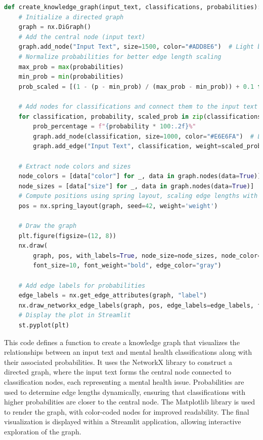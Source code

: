 
\begin{tcolorbox}[colback=gray!5!white, colframe=gray!80!black, boxrule=0.5pt, title=Knowledge Graph Creation]
    \begin{lstlisting}[language=Python]
def create_knowledge_graph(input_text, classifications, probabilities):
    # Initialize a directed graph
    graph = nx.DiGraph()
    # Add the central node (input text)
    graph.add_node("Input Text", size=1500, color="#ADD8E6")  # Light blue for the central node
    # Normalize probabilities for better edge length scaling
    max_prob = max(probabilities)
    min_prob = min(probabilities)
    prob_scaled = [(1 - (p - min_prob) / (max_prob - min_prob)) + 0.1 for p in probabilities]  # Invert probabilities for distances

    # Add nodes for classifications and connect them to the input text
    for classification, probability, scaled_prob in zip(classifications, probabilities, prob_scaled):
        prob_percentage = f"{probability * 100:.2f}%"
        graph.add_node(classification, size=1000, color="#E6E6FA")  # Light lavender for classification nodes
        graph.add_edge("Input Text", classification, weight=scaled_prob, label=prob_percentage)

    # Extract node colors and sizes
    node_colors = [data["color"] for _, data in graph.nodes(data=True)]
    node_sizes = [data["size"] for _, data in graph.nodes(data=True)]
    # Compute positions using spring layout, scaling edge lengths with inverted probabilities
    pos = nx.spring_layout(graph, seed=42, weight='weight')

    # Draw the graph
    plt.figure(figsize=(12, 8))
    nx.draw(
        graph, pos, with_labels=True, node_size=node_sizes, node_color=node_colors,
        font_size=10, font_weight="bold", edge_color="gray")

    # Add edge labels for probabilities
    edge_labels = nx.get_edge_attributes(graph, "label")
    nx.draw_networkx_edge_labels(graph, pos, edge_labels=edge_labels, font_color="red")
    # Display the plot in Streamlit
    st.pyplot(plt)
    \end{lstlisting}
\end{tcolorbox}

\noindent
This code defines a function to create a knowledge graph that visualizes the relationships between an input text and mental health classifications along with their associated probabilities. It uses the NetworkX library to construct a directed graph, where the input text forms the central node connected to classification nodes, each representing a mental health issue. Probabilities are used to determine edge lengths dynamically, ensuring that classifications with higher probabilities are closer to the central node. The Matplotlib library is used to render the graph, with color-coded nodes for improved readability. The final visualization is displayed within a Streamlit application, allowing interactive exploration of the graph.


